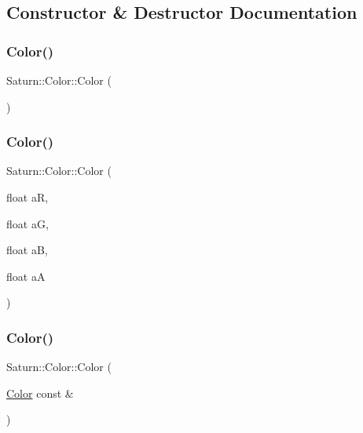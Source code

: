 \subsection{Constructor \& Destructor Documentation}
\mbox{\label{class_saturn_1_1_color_a53b6d6aca71d15945bec664a1c1dbe10}} 
\subsubsection{\texorpdfstring{Color()}{Color()}\hspace{0.1cm}{\footnotesize\ttfamily [1/4]}}
{\footnotesize\ttfamily Saturn\+::\+Color\+::\+Color (\begin{DoxyParamCaption}{ }\end{DoxyParamCaption})\hspace{0.3cm}{\ttfamily [default]}}

\mbox{\label{class_saturn_1_1_color_a1ad1324d4f4fe5af767dc6f269d1aed5}} 
\subsubsection{\texorpdfstring{Color()}{Color()}\hspace{0.1cm}{\footnotesize\ttfamily [2/4]}}
{\footnotesize\ttfamily Saturn\+::\+Color\+::\+Color (\begin{DoxyParamCaption}\item[{float}]{aR,  }\item[{float}]{aG,  }\item[{float}]{aB,  }\item[{float}]{aA }\end{DoxyParamCaption})}

\mbox{\label{class_saturn_1_1_color_a80aa8e4275404b9c82b6c5063a16bdda}} 
\subsubsection{\texorpdfstring{Color()}{Color()}\hspace{0.1cm}{\footnotesize\ttfamily [3/4]}}
{\footnotesize\ttfamily Saturn\+::\+Color\+::\+Color (\begin{DoxyParamCaption}\item[{\mbox{\hyperlink{class_saturn_1_1_color}{Color}} const \&}]{ }\end{DoxyParamCaption})\hspace{0.3cm}{\ttfamily [default]}}

